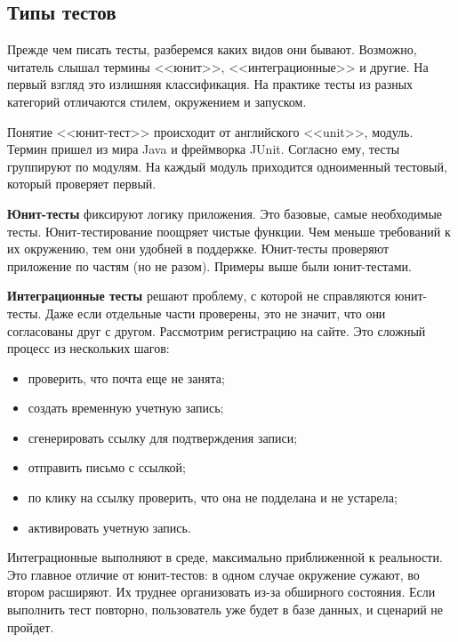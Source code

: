 \subsection{Типы тестов}

Прежде чем писать тесты, разберемся каких видов они бывают. Возможно, читатель
слышал термины <<юнит>>, <<интеграционные>> и другие. На первый взгляд это
излишняя классификация. На практике тесты из разных категорий отличаются стилем,
окружением и запуском.

Понятие <<юнит-тест>> происходит от английского <<unit>>, модуль. Термин пришел
из мира Java и фреймворка JUnit. Согласно ему, тесты группируют по модулям. На
каждый модуль приходится одноименный тестовый, который проверяет первый.

\textbf{Юнит-тесты} фиксируют логику приложения. Это базовые, самые необходимые
тесты. Юнит-тестирование поощряет чистые функции. Чем меньше требований к их
окружению, тем они удобней в поддержке. Юнит-тесты проверяют приложение по
частям (но не разом). Примеры выше были юнит-тестами.

\textbf{Интеграционные тесты} решают проблему, с которой не справляются
юнит-тесты. Даже если отдельные части проверены, это не значит, что они
согласованы друг с другом. Рассмотрим регистрацию на сайте. Это сложный процесс
из нескольких шагов:

\begin{itemize}

\item
  проверить, что почта еще не занята;

\item
  создать временную учетную запись;

\item
  сгенерировать ссылку для подтверждения записи;

\item
  отправить письмо с ссылкой;

\item
  по клику на ссылку проверить, что она не подделана и не устарела;

\item
  активировать учетную запись.

\end{itemize}

Интеграционные выполняют в среде, максимально приближенной к реальности. Это
главное отличие от юнит-тестов: в одном случае окружение сужают, во втором
расширяют. Их труднее организовать из-за обширного состояния. Если выполнить
тест повторно, пользователь уже будет в базе данных, и сценарий не пройдет.

